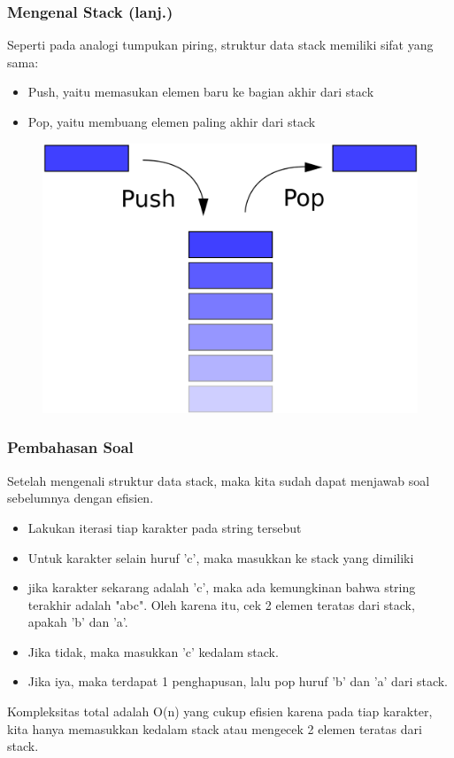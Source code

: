 \begin{frame}
\frametitle{Mengenal Stack (lanj.)}

Seperti pada analogi tumpukan piring, struktur data stack memiliki sifat yang sama:
\begin{itemize}
	\item Push, yaitu memasukan elemen baru ke bagian akhir dari stack
	\item Pop, yaitu membuang elemen paling akhir dari stack
\end{itemize}

\begin{figure}
	\centering
	\includegraphics[width=4 cm]{asset/stack.png}
\end{figure}
\end{frame}

\begin{frame}
\frametitle{Pembahasan Soal}

Setelah mengenali struktur data stack, maka kita sudah dapat menjawab soal sebelumnya dengan efisien.
\begin{itemize}
	\item Lakukan iterasi tiap karakter pada string tersebut
	\item Untuk karakter selain huruf 'c', maka masukkan ke stack yang dimiliki
	\item jika karakter sekarang adalah 'c', maka ada kemungkinan bahwa string terakhir adalah "abc". Oleh karena itu, cek 2 elemen teratas dari stack, apakah 'b' dan 'a'.
	\item Jika tidak, maka masukkan 'c' kedalam stack.
	\item Jika iya, maka terdapat 1 penghapusan, lalu pop huruf 'b' dan 'a' dari stack.
\end{itemize}
Kompleksitas total adalah O(n) yang cukup efisien karena pada tiap karakter, kita hanya memasukkan kedalam stack atau mengecek 2 elemen teratas dari stack.
\end{frame}




